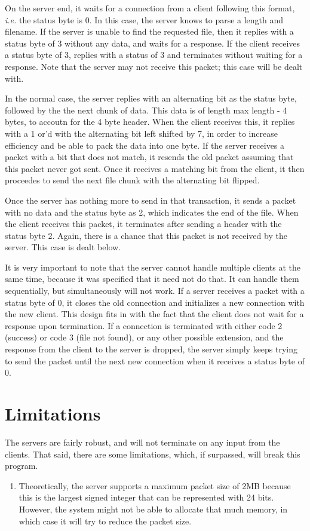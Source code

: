 \documentclass[11pt]{article}
\begin{document}
On the server end, it waits for a connection from a client following this format, \emph{i.e.} the status byte is 0. In this case, the server knows to parse a length and filename. If the server is unable to find the requested file, then it replies with a status byte of 3 without any data, and waits for a response. If the client receives a status byte of 3, replies with a status of 3 and terminates without waiting for a response. Note that the server may not receive this packet; this case will be dealt with.

In the normal case, the server replies with an alternating bit as the status byte, followed by the the next chunk of data. This data is of length max length - 4 bytes, to accoutn for the 4 byte header. When the client receives this, it replies with a 1 or'd with the alternating bit left shifted by 7, in order to increase efficiency and be able to pack the data into one byte. If the server receives a packet with a bit that does not match, it resends the old packet assuming that this packet never got sent. Once it receives a matching bit from the client, it then proceedes to send the next file chunk with the alternating bit flipped.

Once the server has nothing more to send in that transaction, it sends a packet with no data and the status byte as 2, which indicates the end of the file. When the client receives this packet, it terminates after sending a header with the status byte 2. Again, there is a chance that this packet is not received by the server. This case is dealt below.

It is very important to note that the server cannot handle multiple clients at the same time, because it was specified that it need not do that. It can handle them sequentially, but simultaneously will not work. If a server receives a packet with a status byte of 0, it closes the old connection and initializes a new connection with the new client. This design fits in with the fact that the client does not wait for a response upon termination. If a connection is terminated with either code 2 (success) or code 3 (file not found), or any other possible extension, and the response from the client to the server is dropped, the server simply keeps trying to send the packet until the next new connection when it receives a status byte of 0.


\section{Limitations}
The servers are fairly robust, and will not terminate on any input from the clients. That said, there are some limitations, which, if surpassed, will break this program.
\begin{enumerate}
\item Theoretically, the server supports a maximum packet size of 2MB because this is the largest signed integer that can be represented with 24 bits. However, the system might not be able to allocate that much memory, in which case it will try to reduce the packet size.
\end{enumerate}
\end{document}
